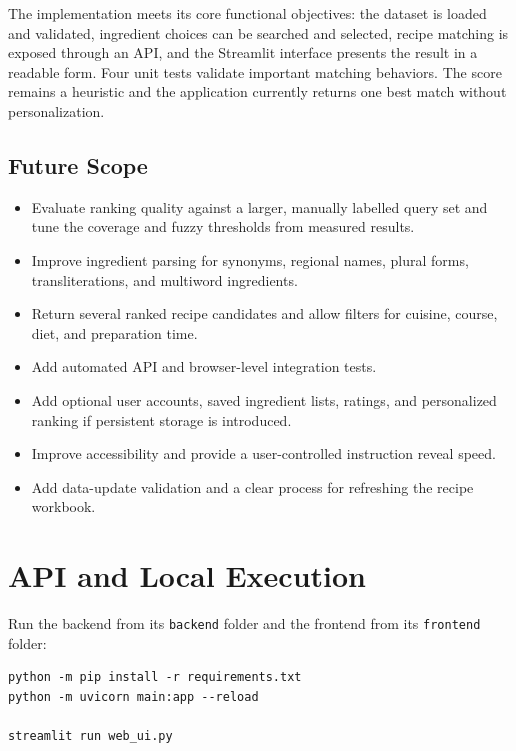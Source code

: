 \documentclass[12pt,a4paper]{report}
\begin{document}
The implementation meets its core functional objectives: the dataset is loaded and validated, ingredient choices can be searched and selected, recipe matching is exposed through an API, and the Streamlit interface presents the result in a readable form. Four unit tests validate important matching behaviors. The score remains a heuristic and the application currently returns one best match without personalization.

\section{Future Scope}
\label{sec:future}

\begin{itemize}
  \item Evaluate ranking quality against a larger, manually labelled query set and tune the coverage and fuzzy thresholds from measured results.
  \item Improve ingredient parsing for synonyms, regional names, plural forms, transliterations, and multiword ingredients.
  \item Return several ranked recipe candidates and allow filters for cuisine, course, diet, and preparation time.
  \item Add automated API and browser-level integration tests.
  \item Add optional user accounts, saved ingredient lists, ratings, and personalized ranking if persistent storage is introduced.
  \item Improve accessibility and provide a user-controlled instruction reveal speed.
  \item Add data-update validation and a clear process for refreshing the recipe workbook.
\end{itemize}



\appendix

\chapter{API and Local Execution}
\label{app:publication}

Run the backend from its \texttt{backend} folder and the frontend from its \texttt{frontend} folder:

\begin{verbatim}
python -m pip install -r requirements.txt
python -m uvicorn main:app --reload

streamlit run web_ui.py
\end{verbatim}
\end{document}

